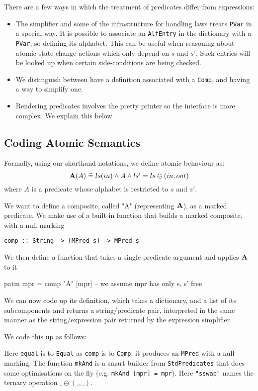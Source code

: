 There are a few ways in which the treatment of predicates
differ from expressions:
\begin{itemize}
  \item
    The simplifier and some of the infrastructure for handling
    laws treats \texttt{PVar} in a special way.
    It is possible to associate an \texttt{AlfEntry} in the dictionary
    with a \texttt{PVar}, so defining its alphabet.
    This can be useful when reasoning about atomic state-change
    actions which only depend on $s$ and $s'$.
    Such entries will be looked up when certain
    side-conditions are being checked.
  \item
    We distinguish between have a definition associated with a \texttt{Comp},
    and having a way to simplify one.
  \item
    Rendering predicates involves the pretty printer
    so the interface is more complex.
    We explain this below.
\end{itemize}



\subsection{Coding Atomic Semantics}

Formally, using our shorthand notations, we define atomic behaviour as:
\[
    \mathbf{A}(A) \mathrel{\widehat=} ls(in) \land A \land ls'=ls\ominus(in,out)
\]
where $A$ is a predicate whose alphabet is restricted to $s$ and $s'$.

We want to define a composite, called "A" (representing $\mathbf{A}$),
as a marked predicate.
We make use of a built-in function that builds
a marked composite, with a null marking
\begin{verbatim}
comp :: String -> [MPred s] -> MPred s
\end{verbatim}
We then define a function that takes a single predicate argument
and applies $\mathbf{A}$ to it
\begin{code}
patm mpr = comp "A" [mpr] -- we assume mpr has only s, s' free
\end{code}
We can now code up its definition,
which takes a dictionary, and a list of its subcomponents
and returns a string/predicate pair,
interpreted in the same manner as the string/expression pair
returned by the expression simplifier.

We code this up as follows:
Here \texttt{equal} is to \texttt{Equal} as \texttt{comp} is to \texttt{Comp}:
it produces an \texttt{MPred} with a null marking.
The function \texttt{mkAnd} is a smart builder from \texttt{StdPredicates}
that does some optimisations on the fly (e.g. \verb$mkAnd [mpr] = mpr$).
Here \texttt{"sswap"} names the ternary operation $\_\ominus(\_,\_)$.

